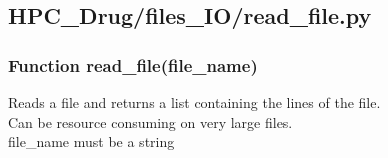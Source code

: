 

\subsection{HPC\_Drug/files\_IO/read\_file.py}

    \subsubsection{Function read\_file(file\_name)}

        Reads a file and returns a list containing the lines of the file.\\
        Can be resource consuming on very large files.\\
        file\_name must be a string 